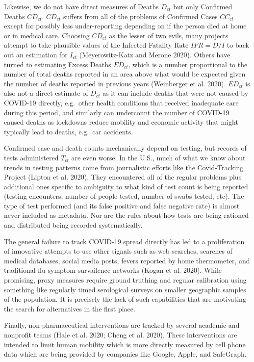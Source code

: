 \documentclass[
]{article}
\begin{document}
Likewise, we do not have direct measures of Deaths \(D_{ct}\) but only
Confirmed Deaths \(CD_{ct}\). \(CD_{ct}\) suffers from all of the
problems of Confirmed Cases \(CC_{ct}\) except for possibly less
under-reporting depending on if the person died at home or in medical
care. Choosing \(CD_{ct}\) as the lesser of two evils, many projects
attempt to take plausible values of the Infected Fatality Rate
\(IFR=D/I\) to back out an estimation for \(I_{ct}\) (Meyerowitz-Katz
and Merone 2020). Others have turned to estimating Excess Deaths
\(ED_{ct}\), which is a number proportional to the number of total
deaths reported in an area above what would be expected given the number
of deaths reported in previous years (Weinberger et al. 2020).
\(ED_{ct}\) is also not a direct estimate of \(D_{ct}\) as it can
include deaths that were not caused by COVID-19 directly, e.g.~other
health conditions that received inadequate care during this period, and
similarly can undercount the number of COVID-19 caused deaths as
lockdowns reduce mobility and economic activity that might typically
lead to deaths, e.g.~car accidents.

Confirmed case and death counts mechanically depend on testing, but
records of tests administered \(T_{ct}\) are even worse. In the U.S.,
much of what we know about trends in testing patterns come from
journalistic efforts like the Covid-Tracking Project (Lipton et al.
2020). They encountered all of the regular problems plus additional ones
specific to ambiguity to what kind of test count is being reported
(testing encounters, number of people tested, number of swabs tested,
etc). The type of test performed (and its false positive and false
negative rate) is almost never included as metadata. Nor are the rules
about how tests are being rationed and distributed being recorded
systematically.

The general failure to track COVID-19 spread directly has led to a
proliferation of innovative attempts to use other signals such as web
searches, searches of medical databases, social media posts, fevers
reported by home thermometer, and traditional flu symptom survailence
networks (Kogan et al. 2020). While promising, proxy measures require
ground truthing and regular calibration using something like regularly
timed serological surveys on smaller geographic samples of the
population. It is precisely the lack of such capabilities that are
motivating the search for alternatives in the first place.

Finally, non-pharmaceutical interventions are tracked by several
academic and nonprofit teams (Hale et al. 2020; Cheng et al. 2020).
These interventions are intended to limit human mobility which is more
directly measured by cell phone data which are being provided by
companies like Google, Apple, and SafeGraph.
\end{document}
